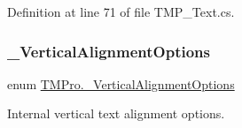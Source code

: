 Definition at line 71 of file T\+M\+P\+\_\+\+Text.\+cs.

\mbox{\label{namespace_t_m_pro_a07b15f9663ec46da089aeb784eccf193}} 
\subsubsection{\texorpdfstring{\_VerticalAlignmentOptions}{\_VerticalAlignmentOptions}}
{\footnotesize\ttfamily enum \mbox{\hyperlink{namespace_t_m_pro_a07b15f9663ec46da089aeb784eccf193}{T\+M\+Pro.\+\_\+\+Vertical\+Alignment\+Options}}\hspace{0.3cm}{\ttfamily [strong]}}



Internal vertical text alignment options. 

